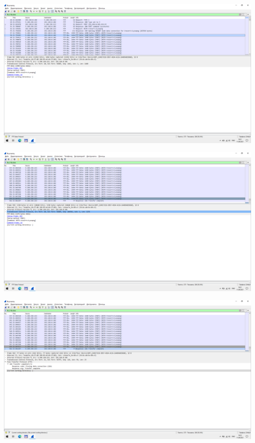 \includegraphics[width=\textwidth]{screenshots/ftp_transfer_2}

\includegraphics[width=\textwidth]{screenshots/ftp_transfer_3}

\includegraphics[width=\textwidth]{screenshots/ftp_end_1}

